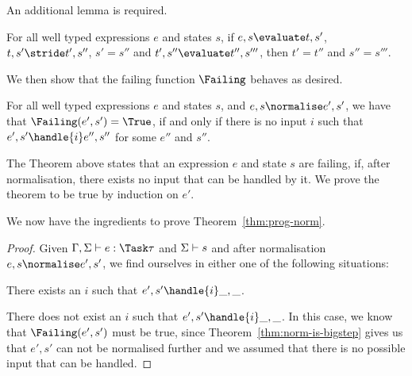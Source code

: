 An additional lemma is required.

\begin{lemma}[]
  For all well typed expressions $e$ and states $s$,
  if $e,s \evaluate t,s'$, $t,s' \stride t',s''$, $s'=s''$ and $t',s'' \evaluate t'',s'''$,
  then $t'=t''$ and $s''=s'''$.
  \label{lem:stride-does-not-eval}
\end{lemma}


We then show that the failing function $\Failing$ behaves as desired.

\begin{theorem}
  For all well typed expressions $e$ and states $s$,
  and $e,s \normalise e',s'$,
  we have that $\Failing(e',s') = \True$,
  if and only if there is no input $i$
  such that $e',s'\handle{i} e'',s''$ for some $e''$ and $s''$.
  \label{thm:failing}
\end{theorem}

The Theorem above states that an expression $e$ and state $s$ are failing, if,
after normalisation, there exists no input that can be handled by it.
We prove the theorem to be true by induction on $e'$.


We now have the ingredients to prove Theorem~\ref{thm:prog-norm}.

\begin{proof}
  Given $\Gamma,\Sigma\infers e:\Task\tau$ and $\Sigma\vdash s$ and after
  normalisation $e,s \normalise e',s'$, we find ourselves in either one of the
  following situations:

  There exists an $i$ such that $e',s'\handle{i}\_,\_$.

  There does not exist an $i$ such that $e',s'\handle{i}\_,\_$. In this case, we
  know that $\Failing(e',s')$ must be true, since Theorem~\ref{thm:norm-is-bigstep}
  gives us that $e',s'$ can not be normalised further and we assumed that there
  is no possible input that can be handled.
\end{proof}



